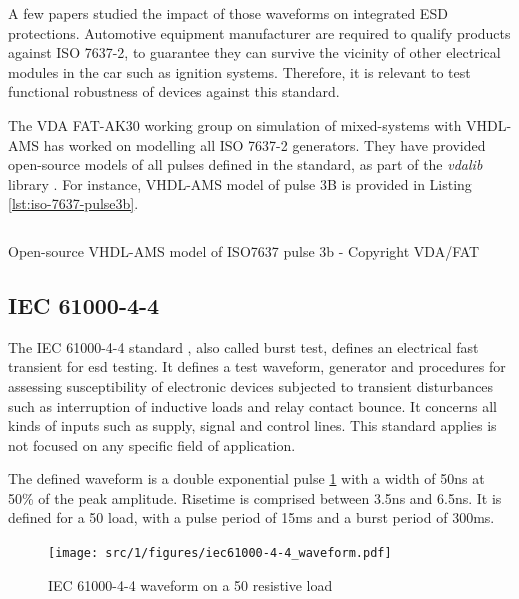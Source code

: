 A few papers \cite{is-iso7637-real, iso7637-2-new-automotive-reqs, robustness-esd-iso7637} studied the impact of those waveforms on integrated ESD protections.
Automotive equipment manufacturer are required to qualify products against ISO 7637-2, to guarantee they can survive the vicinity of other electrical modules in the car such as ignition systems.
Therefore, it is relevant to test functional robustness of devices against this standard.

The VDA FAT-AK30 working group on simulation of mixed-systems with VHDL-AMS \cite{fat-ak30} has worked on modelling all ISO 7637-2 generators. They have provided open-source models of all pulses defined in the standard, as part of the \textit{vdalib} library \cite{vdalib}.
For instance, VHDL-AMS model of pulse 3B is provided in Listing \ref{lst:iso-7637-pulse3b}.

\begin{code}
\inputminted[frame=single,firstline=157,lastline=228]{VHDL}{src/1/snippets/iso_7637_pulse3b.vhd}
\caption{Open-source VHDL-AMS model of ISO7637 pulse 3b - Copyright VDA/FAT \cite{vdalib-isopulse3b}}
\label{lst:iso-7637-pulse3b}
\end{code}


\subsection{IEC 61000-4-4}

The IEC 61000-4-4 standard \cite{iec61000-4-4}, also called burst test, defines an electrical fast transient for \gls{esd} testing.
It defines a test waveform, generator and procedures for assessing susceptibility of electronic devices subjected to transient disturbances such as interruption of inductive loads and relay contact bounce.
It concerns all kinds of inputs such as supply, signal and control lines.
This standard applies is not focused on any specific field of application.

The defined waveform is a double exponential pulse \ref{fig:iec_4_4_pulse} with a width of 50ns at 50\% of the peak amplitude.
Risetime is comprised between 3.5ns and 6.5ns.
It is defined for a 50\textOmega{} load, with a pulse period of 15ms and a burst period of 300ms.

\begin{figure}[!h]
  \centering
  \texttt{[image: src/1/figures/iec61000-4-4\_waveform.pdf]}
  \caption{IEC 61000-4-4 waveform on a 50\textOmega{} resistive load}
  \label{fig:iec_4_4_pulse}
\end{figure}

